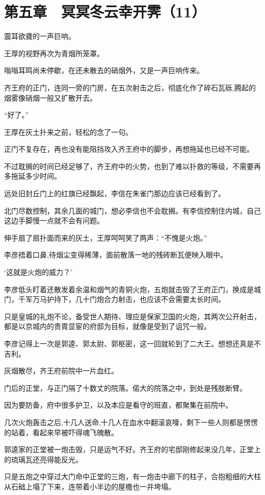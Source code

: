 \section{第五章　冥冥冬云幸开霁（11）}

震耳欲聋的一声巨响。

王厚的视野再次为青烟所笼罩。

嗡嗡耳鸣尚未停歇，在还未散去的硝烟外，又是一声巨响传来。

齐王府的正门，连同一旁的门房，在五次射击之后，彻底化作了碎石瓦砾,腾起的烟雾像硝烟一般又扩散开去。

“好了。”

王厚在灰土扑来之前，轻松的念了一句。

正门不复存在，再也没有能阻挡攻入齐王府中的脚步，再想拖延也已经不可能。

不过耽搁的时间已经足够了，齐王府中的火势，也到了难以扑救的等级，不需要再多拖延多少时间。

远处旧封丘门上的红旗已经飘起，李信在朱雀门那边应该已经看到了。

北门尽数控制，其余几面的城门，想必李信也不会耽搁。有李信控制住内城，自己这边手脚慢一点就不会有问题。

伸手扇了扇扑面而来的灰土，王厚呵呵笑了两声：“不愧是火炮。”

李彦捂着口鼻,待烟尘变得稀薄，面前散落一地的残砖断瓦便映入眼中。

‘这就是火炮的威力？’

李彦低头盯着还散发着余温和烟气的青铜火炮，五炮就击毁了王府正门，换成是城门，千军万马护持下，几十门炮合力射击，也应该不会需要太长时间。

只是皇城的礼炮不论，备受世人期待、理应是保家卫国的火炮，其两次公开射击，都是以京城内的贵胄显宦的府邸为目标，就像是受到了诅咒一般。

李彦记得上一次是郭逵、郭太尉、郭枢密，这一回就轮到了二大王。想想还真是不吉利。

灰烟散尽，齐王府前院中一片血红。

门后的正堂，与正门隔了十数丈的院落。偌大的院落之中，到处是残肢断臂。

因为要防备，府中很多护卫，以及本应是看守的班直，都聚集在前院中。

几次火炮轰击之后,十几人送命,十几人在血水中翻滚哀嚎，剩下一些人则都是愣愣的站着，看起来早被吓得魂飞魄散。

郭逵家的正堂被一炮击毁，只是运气不好。齐王府的宅邸刚修起来没几年，正堂上的琉璃瓦还亮得能反光。

只是五炮之中穿过大门命中正堂的三炮，有一炮击中廊下的柱子，合抱粗细的大柱从石础上塌了下来，连带着小半边的屋檐也一并垮塌。

